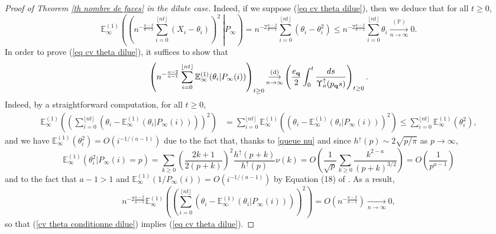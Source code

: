 \documentclass[11pt]{article}
\numberwithin{equation}{section}
\def\E{\mathbb{E}}
\def\P{\mathbb{P}}
\begin{document}
\begin{proof}[Proof of Theorem \ref{th nombre de faces} in the dilute case]
	Indeed, if we suppose (\ref{eq cv theta dilue}), then we deduce that for all $t \ge 0$,
	$$
	\E^{(1)}_\infty \left( \left. \left( n^{-\frac{a-2}{a-1}} \sum_{i=0}^{\lfloor nt \rfloor} (X_i-\theta_i) \right)^2 \ \right\vert  P_\infty \right)
	= n^{-2\frac{a-2}{a-1}}\sum_{i=0}^{\lfloor nt \rfloor} (\theta_i-\theta_i^2)
	\le n^{-2\frac{a-2}{a-1}}\sum_{i=0}^{\lfloor nt \rfloor } \theta_i
	\mathop{\longrightarrow}\limits_{n\to \infty}^{(\P)} 0.
	$$
	In order to prove (\ref{eq cv theta dilue}), it suffices to show that
	\begin{equation}\label{cv theta conditionne dilue}
	\left(n^{-\frac{a-2}{a-1}}\sum_{i=0}^{\lfloor nt \rfloor} \E^{(1)}_\infty( \theta_i | P_\infty(i))\right)_{t \ge 0}
		\mathop{\longrightarrow}\limits_{n \to \infty}^{(\mathrm{d})}
		\left(\frac{{e}_{\bf q}}{2}
		\int_0^t \frac{ds}{\Upsilon_a^\uparrow(p_{\bf q} s)}\right)_{t\ge 0}.
	\end{equation}
	Indeed, by a straightforward computation, for all $t\ge 0$, 
	\begin{align*}
	\E^{(1)}_\infty
	\left(
	\left(
	\sum_{i=0}^{\lfloor nt \rfloor}
	\left(
	\theta_i- \E^{(1)}_\infty( \theta_i | P_\infty(i))
	\right)
	\right)^2
	\right)
	&=
	\sum_{i=0}^{\lfloor nt \rfloor}
	\E^{(1)}_\infty
	\left(
	\left(
	\theta_i- \E^{(1)}_\infty( \theta_i | P_\infty(i))
	\right)^2
	\right)
	\le 
	\sum_{i=0}^{\lfloor nt \rfloor}
	\E^{(1)}_\infty
	\left(
	\theta_i^2
	\right),
	\end{align*}
	and we have $\E^{(1)}_\infty
	\left(
	\theta_i^2
	\right) = O(i^{-1/(a-1)})$ due to the fact that, thanks to \eqref{queue nu} and since $h^\uparrow(p)\sim 2 \sqrt{p/\pi}$ as $p \to \infty$, 
	\begin{equation}\label{majoration theta carre}
	\E^{(1)}_\infty (\theta_i^2| P_\infty(i)=p) = \sum_{k\ge0} \left(\frac{2k+1}{2(p+k)}\right)^2 \frac{h^\uparrow(p+k)}{h^\uparrow(p)}\nu(k) = O \left(\frac{1}{\sqrt{p}} \sum_{k\ge 0} \frac{k^{2-a}}{(p+k)^{3/2}}  \right) 
	= O\left(\frac{1}{p^{a-1}}\right)
	\end{equation}
	and to the fact that $a-1>1$ and $\E^{(1)}_\infty(1/P_\infty(i)) = O(i^{-1/(a-1)})$ by Equation (18) of \cite{BC}.
	As a result, 
	\begin{equation}\label{eq theta proche de esp conditionnelle}
	n^{-2\frac{a-2}{a-1}}\E^{(1)}_\infty
	\left(
	\left(
	\sum_{i=0}^{\lfloor nt \rfloor}
	\left(
	\theta_i- \E^{(1)}_\infty( \theta_i | P_\infty(i))
	\right)
	\right)^2
	\right)
	=O\left(
	n^{-\frac{a-2}{a-1}}
	\right)
	\mathop{\longrightarrow}\limits_{n \to \infty} 0,
	\end{equation}
	so that (\ref{cv theta conditionne dilue}) implies (\ref{eq cv theta dilue}).
	

\end{proof}
\end{document}
